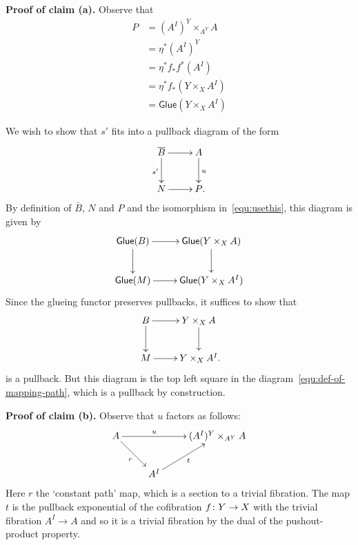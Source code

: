 \documentclass[reqno,a4paper,oneside]{amsart}
\begin{document}
\noindent 
{\bf {Proof of claim (a)}.} Observe that  
\begin{align*}
P & = (A^I)^Y \times_{A^Y} A \\
 & = \eta^* (A^I)^Y \\
 & = \eta^* f_* f^* (A^I) \\
 & = \eta^* f_* (Y \times_X A^I) \\
 & =  \mathsf{Glue}(Y \times_X A^I)
\end{align*}




We wish to show that $s'$ fits into a pullback diagram of the form
\begin{equation*}
\label{equ:key}
\begin{gathered}
\xymatrix{
\overline{B} \ar[d]_{s'}  \ar[r] &  A \ar[d]^{u} \\
N \ar[r] & P \rlap{.} }
\end{gathered} 
\end{equation*}
By definition of $\bar{B}$, $N$ and $P$ and the isomorphism in~\eqref{equ:usethis}, this diagram is given by 
\begin{equation*}
\label{equ:key-as-glueing}
\begin{gathered}
\xymatrix{
\mathsf{Glue}(B) \ar[d]   \ar[r]   & \mathsf{Glue}(Y \times_X A) \ar[d]  \\
\mathsf{Glue}(M) \ar[r]   & \mathsf{Glue}(Y \times_X A^I) }
\end{gathered} 
\end{equation*}
Since the glueing functor preserves pullbacks, it suffices to show that 
\[
\xymatrix{
B \ar[d]   \ar[r]   & Y \times_X A \ar[d]  \\
M \ar[r]   & Y \times_X A^I \rlap{.}}
\] 
is a pullback. But this diagram is the top left  square in the diagram~\eqref{equ:def-of-mapping-path},
which is a pullback by construction. 




\medskip

{\bf Proof of claim (b).} Observe that $u$ factors as follows:
\[
\xymatrix{
A \ar[rr]^-u  \ar[dr]_{r}  & &  (A^I)^Y \times_{A^Y} A \\
 & A^I \ar[ur]_{t}  & }
 \]
Here $r$  the `constant path' map, which is a section to a trivial fibration. The map $t$ is the pullback exponential of the cofibration $f \colon Y \to X$
with the trivial fibration $A^I \to A$ and so it is a trivial fibration by the dual of the pushout-product property.
\end{document}
